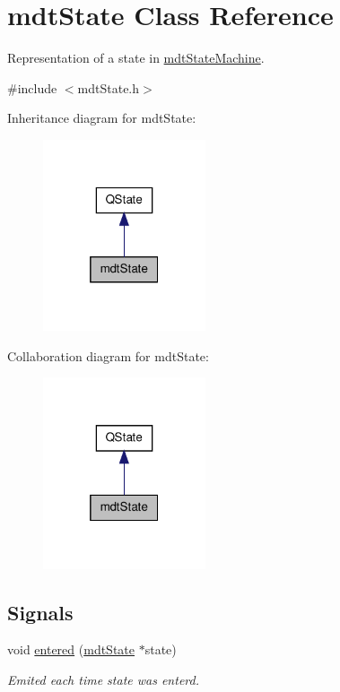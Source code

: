 \hypertarget{classmdt_state}{\section{mdt\-State Class Reference}
\label{classmdt_state}
}


Representation of a state in \hyperlink{classmdt_state_machine}{mdt\-State\-Machine}.  




{\ttfamily \#include $<$mdt\-State.\-h$>$}



Inheritance diagram for mdt\-State\-:
\nopagebreak
\begin{figure}[H]
\begin{center}
\leavevmode
\includegraphics[width=136pt]{classmdt_state__inherit__graph}
\end{center}
\end{figure}


Collaboration diagram for mdt\-State\-:
\nopagebreak
\begin{figure}[H]
\begin{center}
\leavevmode
\includegraphics[width=136pt]{classmdt_state__coll__graph}
\end{center}
\end{figure}
\subsection*{Signals}
\begin{DoxyCompactItemize}
\item 
void \hyperlink{classmdt_state_af439b403568bc41b3db70e037bfd8456}{entered} (\hyperlink{classmdt_state}{mdt\-State} $\ast$state)
\begin{DoxyCompactList}\small\item\em Emited each time state was enterd. \end{DoxyCompactList}\end{DoxyCompactItemize}
